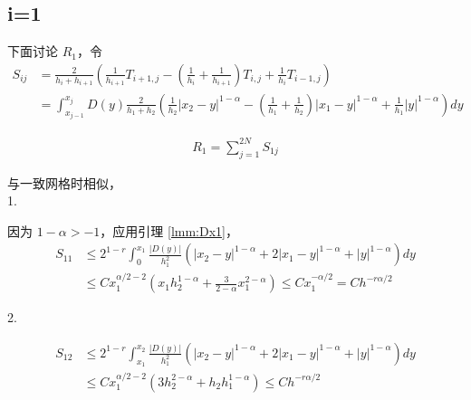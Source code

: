 \documentclass{ctexart}
\theoremstyle{definition}
\theoremstyle{remark}
\numberwithin{equation}{section}
\begin{document}
\subsection{i=1}


下面讨论 \(R_1\)，令
\begin{equation}
    \begin{aligned}
        S_{ij} &= \frac{2}{h_i + h_{i+1}}
        \left( \frac{1}{h_{i+1}} T_{i+1, j}
        - (\frac{1}{h_{i}}+\frac{1}{h_{i+1}}) T_{i,j}
        +  \frac{1}{h_{i}} T_{i-1, j} \right)                     \\
        &= \int_{x_{j-1}}^{x_{j}}
        D(y) \frac{2}{h_1 + h_{2}}
        ( \frac{1}{h_{2}} |x_{2}-y|^{1-\alpha}
        - (\frac{1}{h_{1}}+\frac{1}{h_{2}}) |x_{1}-y|^{1-\alpha}
        +  \frac{1}{h_{1}}|y|^{1-\alpha} )  dy
    \end{aligned}
\end{equation}

\begin{equation}
    \begin{aligned}
        R_1 = \sum_{j=1}^{2N} S_{1j}
    \end{aligned}
\end{equation}

与一致网格时相似，\\
1.

因为 \(1-\alpha > -1\)，应用引理 \ref{lmm:Dx1}，
\begin{equation}
    \begin{aligned}
        S_{11} & \le 2^{1-r} \int_0^{x_1} \frac{|D(y)|}{h_1^2}
        ( |x_{2}-y|^{1-\alpha}
        + 2|x_{1}-y|^{1-\alpha}
        +|y|^{1-\alpha} )  dy                                                                                                         \\
            & \le  C x_1^{\alpha/2-2} (x_1h_2^{1-\alpha} + \frac{3}{2-\alpha}x_1^{2-\alpha}) \le C x_1^{-\alpha/2} = C h^{-r\alpha/2}
    \end{aligned}
\end{equation}

2.

\begin{equation}
    \begin{aligned}
        S_{12} & \le 2^{1-r} \int_{x_1}^{x_2} \frac{|D(y)|}{h_1^2}
        ( |x_{2}-y|^{1-\alpha}
        +2 |x_{1}-y|^{1-\alpha}
        +|y|^{1-\alpha} )  dy                                                                           \\
            & \le C x_1^{\alpha/2-2} (3h_2^{2-\alpha}+h_2h_1^{1-\alpha})  \le C h^{-r\alpha/2}
    \end{aligned}
\end{equation}
\end{document}
